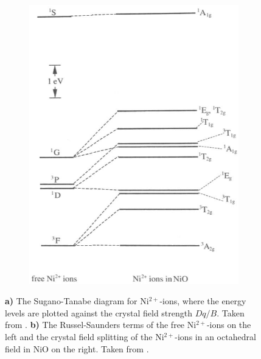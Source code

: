 \begin{figure}[ht]
\begin{subfigure}[b]{0.4\textwidth}
        \includegraphics[width=\textwidth]{pictures/3.png}
        \caption{}
        \label{fig:3}
    \end{subfigure}
    \caption{\textbf{a)} The Sugano-Tanabe diagram for Ni$^{2+}$-ions, where the energy levels are plotted against the crystal field strength $Dq/B$. Taken from . \textbf{b)} The Russel-Saunders terms of the free Ni$^{2+}$-ions on the left and the crystal field splitting of the Ni$^{2+}$-ions in an octahedral field in NiO on the right. Taken from .}
\end{figure}
\FloatBarrier

